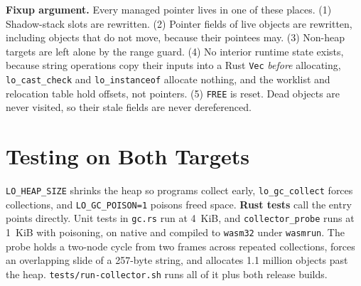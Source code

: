 \documentclass[10pt]{article}
\newcommand{\code}[1]{\texttt{\small #1}}
\begin{document}
\begin{center}
\end{center}

\textbf{Fixup argument.} Every managed pointer lives in one of these places. (1) Shadow-stack slots are rewritten. (2) Pointer fields of live objects are rewritten, including objects that do not move, because their pointees may. (3) Non-heap targets are left alone by the range guard. (4) No interior runtime state exists, because string operations copy their inputs into a Rust \code{Vec} \emph{before} allocating, \code{lo\_cast\_check} and \code{lo\_instanceof} allocate nothing, and the worklist and relocation table hold offsets, not pointers. (5) \code{FREE} is reset. Dead objects are never visited, so their stale fields are never dereferenced.

\section{Testing on Both Targets}
\code{LO\_HEAP\_SIZE} shrinks the heap so programs collect early, \code{lo\_gc\_collect} forces collections, and \code{LO\_GC\_POISON=1} poisons freed space. \textbf{Rust tests} call the entry points directly. Unit tests in \code{gc.rs} run at 4~KiB, and \code{collector\_probe} runs at 1~KiB with poisoning, on native and compiled to \code{wasm32} under \code{wasmrun}. The probe holds a two-node cycle from two frames across repeated collections, forces an overlapping slide of a 257-byte string, and allocates 1.1 million objects past the heap. \code{tests/run-collector.sh} runs all of it plus both release builds.
\end{document}

